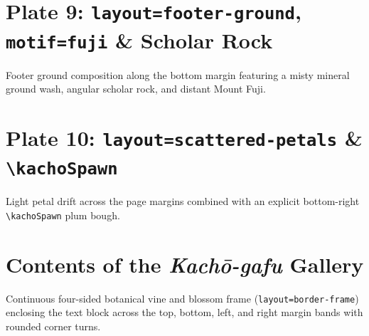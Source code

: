 \documentclass[11pt,a4paper,twoside]{article}
\begin{document}
\section*{Plate 9: \texttt{layout=footer-ground}, \texttt{motif=fuji} \& Scholar Rock}
Footer ground composition along the bottom margin featuring a misty mineral ground wash, angular scholar rock, and distant Mount Fuji.
\clearpage

\section*{Plate 10: \texttt{layout=scattered-petals} \& \texttt{\textbackslash kachoSpawn}}
Light petal drift across the page margins combined with an explicit bottom-right \texttt{\textbackslash kachoSpawn} plum bough.
\clearpage

\section*{Contents of the \emph{Kach\=o-gafu} Gallery}

Continuous four-sided botanical vine and blossom frame (\texttt{layout=border-frame}) enclosing the text block across the top, bottom, left, and right margin bands with rounded corner turns.
\end{document}
